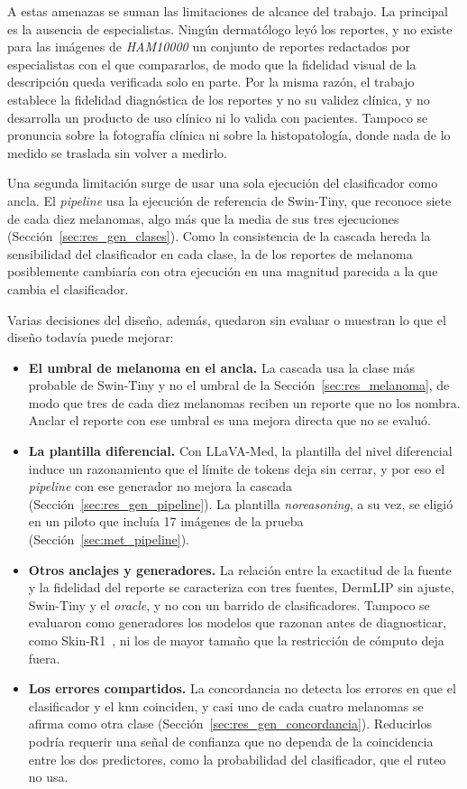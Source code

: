 A estas amenazas se suman las limitaciones de alcance del trabajo. La principal es la ausencia de especialistas.
Ningún dermatólogo leyó los reportes, y no existe para las imágenes de \emph{HAM10000} un conjunto de reportes
redactados por especialistas con el que compararlos, de modo que la fidelidad visual de la descripción queda
verificada solo en parte. Por la misma razón, el trabajo establece la fidelidad diagnóstica de los reportes y no su
validez clínica, y no desarrolla un producto de uso clínico ni lo valida con pacientes. Tampoco se pronuncia sobre la
fotografía clínica ni sobre la histopatología, donde nada de lo medido se traslada sin volver a medirlo.

Una segunda limitación surge de usar una sola ejecución del clasificador como ancla. El \emph{pipeline} usa la
ejecución de referencia de Swin-Tiny, que reconoce siete de cada diez melanomas, algo más que la media de sus tres
ejecuciones (Sección~\ref{sec:res_gen_clases}). Como la consistencia de la cascada hereda la sensibilidad del
clasificador en cada clase, la de los reportes de melanoma posiblemente cambiaría con otra ejecución en una magnitud parecida a la
que cambia el clasificador.

Varias decisiones del diseño, además, quedaron sin evaluar o muestran lo que el diseño todavía puede mejorar:
\begin{itemize}
    \item \textbf{El umbral de melanoma en el ancla.} La cascada usa la clase más probable de Swin-Tiny y no el umbral
    de la Sección~\ref{sec:res_melanoma}, de modo que tres de cada diez melanomas reciben un reporte que no los nombra.
    Anclar el reporte con ese umbral es una mejora directa que no se evaluó.
    \item \textbf{La plantilla diferencial.} Con LLaVA-Med, la plantilla del nivel diferencial induce un razonamiento
    que el límite de tokens deja sin cerrar, y por eso el \emph{pipeline} con ese generador no mejora la cascada
    (Sección~\ref{sec:res_gen_pipeline}). La plantilla \emph{noreasoning}, a su vez, se eligió en un piloto que incluía
    17 imágenes de la prueba (Sección~\ref{sec:met_pipeline}).
    \item \textbf{Otros anclajes y generadores.} La relación entre la exactitud de la fuente y la fidelidad del reporte
    se caracteriza con tres fuentes, DermLIP sin ajuste, Swin-Tiny y el \emph{oracle}, y no con un barrido de
    clasificadores. Tampoco se evaluaron como generadores los modelos que razonan antes de diagnosticar, como
    Skin-R1~\cite{liu2025skinr1}, ni los de mayor tamaño que la restricción de cómputo deja fuera.
    \item \textbf{Los errores compartidos.} La concordancia no detecta los errores en que el clasificador y el
    \gls{knn} coinciden, y casi uno de cada cuatro melanomas se afirma como otra clase
    (Sección~\ref{sec:res_gen_concordancia}). Reducirlos podría requerir una señal de confianza que no dependa de la
    coincidencia entre los dos predictores, como la probabilidad del clasificador, que el ruteo no usa.
\end{itemize}

